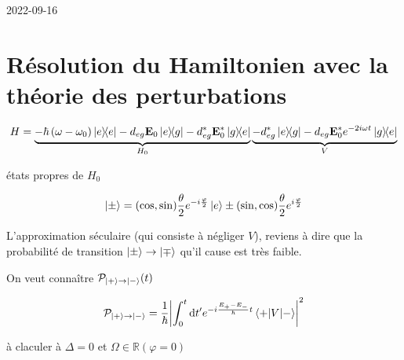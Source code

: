 


2022-09-16

\section*{Résolution du Hamiltonien avec la théorie des perturbations}


$$H = \underbrace{-\hbar \left( \omega -\omega_0 \right) \op e - d_{eg} \vb{E}_0 \op{e}{g} -d_{eg}^{*}\vb{E}_0^*\op{g}{e}}_{H_{0}}  \underbrace{ - d_{eg}^{*}\op{e}{g} - d_{eg}\vb{E}_0^* e^{-2i\omega t} \op{g}{e}}_{V}  $$ 

états propres de $H_0$  

$$\ket{\pm} = (\cos,\sin) \frac{\theta}{2} e^{-i \frac{\varphi}{2} }\ket{e} \pm (\sin,\cos) \frac{\theta}{2}  e^{i \frac{\varphi}{2} }$$ 



L'approximation séculaire (qui consiste à négliger $V$), reviens à dire que la probabilité de transition $\ket{\pm} \to \ket{\mp}$ qu'il cause est très faible.



On veut connaître $\mathcal{P}_{\ket{+}\to \ket{-}}(t)$ 

$$\mathcal{P}_{\ket{+}\to \ket{-}} = \frac{1}{\hbar} \abs{\int_{0}^{t}\dd t' e^{-i \frac{E_+ - E_-}{ \hbar} t}\mel{+}{V}{-}}^2$$ 

à claculer à $\Delta =0$ et $\Omega \in \mathds{R} (\varphi=0)$  


